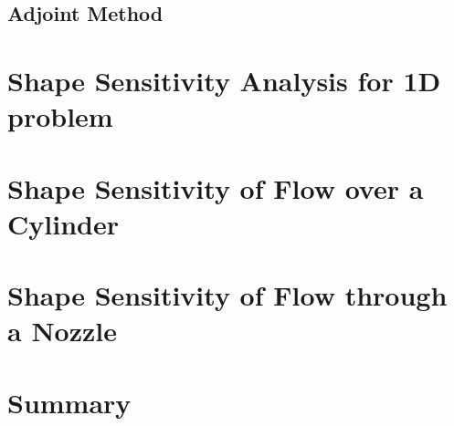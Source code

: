 \subsection{Adjoint Method}

\section{Shape Sensitivity Analysis for 1D problem}

\section{Shape Sensitivity of Flow over a Cylinder}

\section{Shape Sensitivity of Flow through a Nozzle}

\section{Summary}

